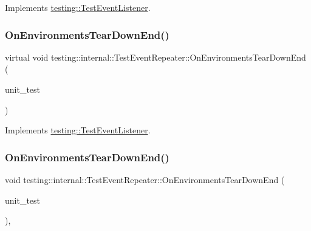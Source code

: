 Implements \mbox{\hyperlink{classtesting_1_1_test_event_listener_aa6502e534919605be45f26a6daf9a40c}{testing\+::\+Test\+Event\+Listener}}.

\mbox{\label{classtesting_1_1internal_1_1_test_event_repeater_a8428220c4cf9f0cea2dfd9a70f07ab7f}} 
\subsubsection{\texorpdfstring{OnEnvironmentsTearDownEnd()}{OnEnvironmentsTearDownEnd()}\hspace{0.1cm}{\footnotesize\ttfamily [1/3]}}
{\footnotesize\ttfamily virtual void testing\+::internal\+::\+Test\+Event\+Repeater\+::\+On\+Environments\+Tear\+Down\+End (\begin{DoxyParamCaption}\item[{const \mbox{\hyperlink{classtesting_1_1_unit_test}{Unit\+Test}} \&}]{unit\+\_\+test }\end{DoxyParamCaption})\hspace{0.3cm}{\ttfamily [virtual]}}



Implements \mbox{\hyperlink{classtesting_1_1_test_event_listener_a9ea04fa7f447865ba76df35e12ba2092}{testing\+::\+Test\+Event\+Listener}}.

\mbox{\label{classtesting_1_1internal_1_1_test_event_repeater_a0bc5fc45653d32b5e1bcad059ee7616b}} 
\subsubsection{\texorpdfstring{OnEnvironmentsTearDownEnd()}{OnEnvironmentsTearDownEnd()}\hspace{0.1cm}{\footnotesize\ttfamily [2/3]}}
{\footnotesize\ttfamily void testing\+::internal\+::\+Test\+Event\+Repeater\+::\+On\+Environments\+Tear\+Down\+End (\begin{DoxyParamCaption}\item[{const \mbox{\hyperlink{classtesting_1_1_unit_test}{Unit\+Test}} \&}]{unit\+\_\+test }\end{DoxyParamCaption})\hspace{0.3cm}{\ttfamily [override]}, {\ttfamily [virtual]}}




